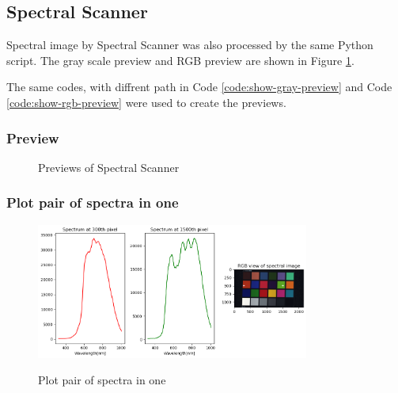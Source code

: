 \subsection{Spectral Scanner}

Spectral image by Spectral Scanner was also processed by    the same
Python script. The gray scale preview and RGB preview are shown in
Figure \ref{fig:spectral-preview}.

The same codes, with diffrent path in Code
\ref{code:show-gray-preview} and Code \ref{code:show-rgb-preview}
were used to create the previews.

\subsubsection{Preview}

\begin{figure}[H] %
  \centering
  \hspace{0.1cm}
  \caption[]{Previews of Spectral Scanner}
  \label{fig:spectral-preview}
\end{figure}

\subsubsection{Plot pair of spectra in one}

\begin{figure}[H]
  \centering
  \caption{Plot pair of spectra in one}
  \includegraphics[width=0.8\textwidth]{fig-task1/spectral-scanner-plot.png}
  \label{fig:spectral-plot}
\end{figure}
